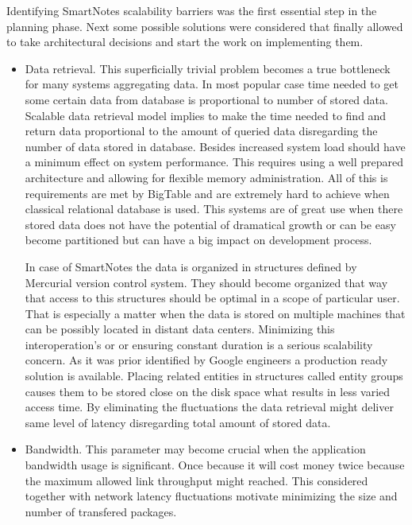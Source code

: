 Identifying SmartNotes  scalability barriers was the first essential step in the planning phase. Next some possible solutions were considered that  finally allowed to take architectural decisions and start the work on implementing them.   
\begin{itemize}
\item{Data retrieval. This superficially trivial problem becomes a true bottleneck for many systems aggregating data. In most popular case time needed to get some certain data from database is proportional to number of stored data. Scalable data retrieval model implies to make the time needed to find and return data proportional to the amount of queried data disregarding the number of data stored in database. Besides increased system load should have a minimum effect on system performance. This requires using a well prepared architecture and allowing for flexible memory administration. All of this is requirements are met by BigTable and are extremely hard to achieve when classical relational database  is used. This systems are of great use when there stored data does not have the potential of dramatical growth or can be easy become partitioned but can have a big impact on development process.  

In case of SmartNotes the data is organized in structures defined by Mercurial version control system. They should become organized that way that access to this structures should be optimal in a scope of particular user. That is especially a matter when the data is stored on multiple machines that can be possibly located in distant data centers. Minimizing this interoperation's or or ensuring constant duration is a serious scalability concern. As it was prior identified by Google engineers a production ready solution is available. Placing related entities in structures called entity groups causes them to be stored close on the disk space what results in less varied access time. By eliminating the fluctuations the data retrieval might deliver same level of latency disregarding total amount of stored data.}
\item{Bandwidth. This parameter may become crucial when the application bandwidth usage is significant. Once because it will cost money twice because the maximum allowed link throughput might reached. This considered together with network latency fluctuations motivate minimizing the size and number of transfered packages.

}
\end{itemize}
